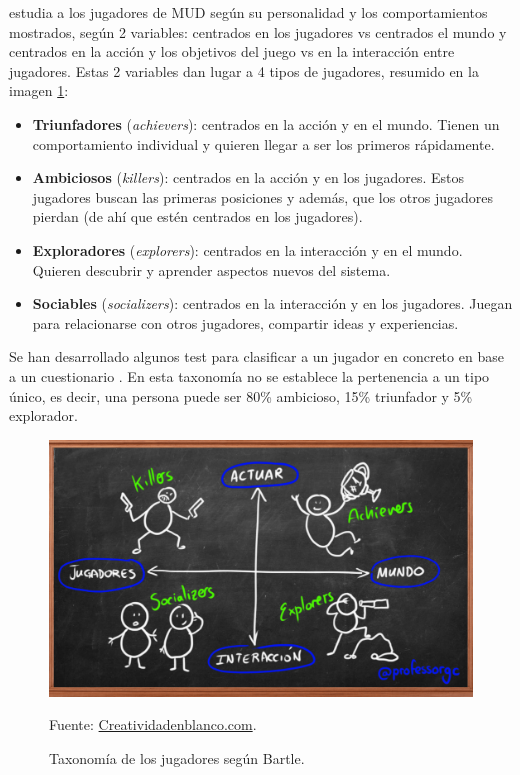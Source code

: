  \cite{TypeMUD} estudia a los jugadores de \gls{MUD} según su personalidad y los comportamientos mostrados, según 2 variables: centrados en los jugadores vs centrados el mundo y centrados en la acción y los objetivos del juego vs en la interacción entre jugadores.
%
Estas 2 variables dan lugar a 4 tipos de jugadores, resumido en la imagen \ref{fig::Bartle}:
\begin{itemize}
	\item  \textbf{Triunfadores} (\textit{achievers}): centrados en la acción y en el mundo.
	Tienen un comportamiento individual y quieren llegar a ser los primeros rápidamente.
	

	\item \textbf{Ambiciosos} (\textit{killers}): centrados en la acción y en los jugadores. 
	Estos jugadores buscan las primeras posiciones y además, que los otros jugadores pierdan (de ahí que estén centrados en los jugadores).
	

	\item \textbf{Exploradores} (\textit{explorers}): centrados en la interacción y en el mundo.
	Quieren descubrir y aprender aspectos nuevos del sistema.

	\item \textbf{Sociables} (\textit{socializers}): centrados en la interacción y en los jugadores.
	Juegan para relacionarse con otros jugadores, compartir ideas y experiencias.
\end{itemize}

Se han desarrollado algunos test para clasificar a un jugador en concreto en base a un cuestionario  \cite{Bartletest}.
%
En esta taxonomía no se establece la pertenencia a un tipo único, es decir, una persona puede ser 80\% ambicioso, 15\% triunfador y 5\% explorador.


\begin{figure}[hbt]
\begin{center}
\caption{Taxonomía de los jugadores según Bartle.}
\label{fig::Bartle}
\includegraphics[scale=0.25]{img/Bartle.png}

\vspace{-0.25cm}
\small{Fuente: \url{Creatividadenblanco.com}.}
\end{center}
\end{figure}


